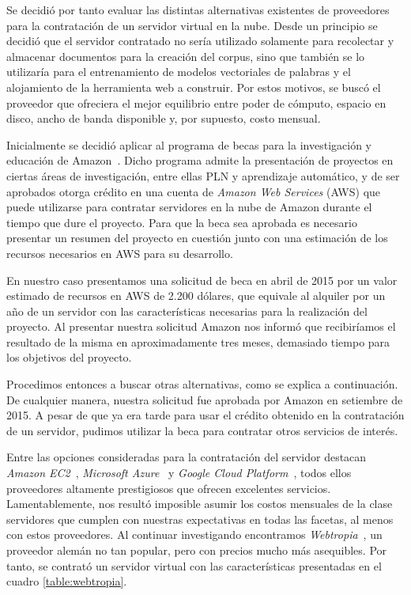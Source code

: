 Se decidió por tanto evaluar las distintas alternativas existentes de proveedores para la contratación de
un servidor virtual en la nube. Desde un principio se decidió que el servidor contratado no sería
utilizado solamente para recolectar y almacenar documentos para la creación del corpus, sino que también
se lo utilizaría para el entrenamiento de modelos vectoriales de palabras y el alojamiento de la herramienta
web a construir. Por estos motivos, se buscó el proveedor que ofreciera el mejor equilibrio entre poder de
cómputo, espacio en disco, ancho de banda disponible y, por supuesto, costo mensual.

Inicialmente se decidió aplicar al programa de becas para la investigación y educación de
Amazon~\cite{AmazonGrants}. Dicho programa admite la presentación de proyectos en ciertas áreas de
investigación, entre ellas PLN y aprendizaje automático, y de ser aprobados otorga crédito en una cuenta
de \textit{Amazon Web Services} (AWS) que puede utilizarse para contratar servidores en la nube de Amazon
durante el tiempo que dure el proyecto. Para que la beca sea aprobada es necesario presentar un resumen
del proyecto en cuestión junto con una estimación de los recursos necesarios en AWS para su desarrollo.

En nuestro caso presentamos una solicitud de beca en abril de 2015 por un valor estimado de recursos en
AWS de 2.200 dólares, que equivale al alquiler por un año de un servidor con las características
necesarias para la realización del proyecto. Al presentar nuestra solicitud Amazon nos informó que
recibiríamos el resultado de la misma en aproximadamente tres meses, demasiado tiempo para los objetivos
del proyecto.

Procedimos entonces a buscar otras alternativas, como se explica a continuación. De cualquier manera,
nuestra solicitud fue aprobada por Amazon en setiembre de 2015. A pesar de que ya era tarde para usar el
crédito obtenido en la contratación de un servidor, pudimos utilizar la beca para contratar otros
servicios de interés.

Entre las opciones consideradas para la contratación del servidor destacan \textit{Amazon
EC2}~\cite{AmazonEC2}, \textit{Microsoft Azure}~\cite{Azure} y \textit{Google Cloud
Platform}~\cite{GCP}, todos ellos proveedores altamente prestigiosos que ofrecen excelentes
servicios. Lamentablemente, nos resultó imposible asumir los costos mensuales de la clase servidores
que cumplen con nuestras expectativas en todas las facetas, al menos con estos proveedores. Al
continuar investigando encontramos \textit{Webtropia}~\cite{Webtropia}, un proveedor alemán no tan
popular, pero con precios mucho más asequibles. Por tanto, se contrató un servidor virtual con las
características presentadas en el cuadro \ref{table:webtropia}.

